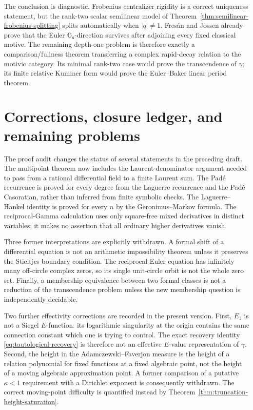 \documentclass[11pt]{article}
\theoremstyle{definition}
\theoremstyle{remark}
\begin{document}
The conclusion is diagnostic.  Frobenius centralizer rigidity is a correct
uniqueness statement, but the rank-two scalar semilinear model of
Theorem~\ref{thm:semilinear-frobenius-splitting} splits automatically when
\(|q|\ne1\).  Fres\'an and Jossen already prove that the
Euler $\mathbb G_a$-direction survives after adjoining every fixed
classical motive.  The remaining depth-one problem is therefore exactly a
comparison/fullness theorem transferring a complex rapid-decay relation to
the motivic category.  Its minimal rank-two case would prove the
transcendence of $\gamma$; its finite relative Kummer form would prove the
Euler--Baker linear period theorem.

\section{Corrections, closure ledger, and remaining problems}

The proof audit changes the status of several statements in the preceding
draft.  The multipoint theorem now includes the Laurent-denominator argument
needed to pass from a rational differential field to a finite Laurent sum.
The Pad\'e recurrence is proved for every degree from the Laguerre recurrence
and the Pad\'e Casoratian, rather than inferred from finite symbolic checks.
The Laguerre--Hankel identity is proved for every \(n\) by the
Geronimus--Markov formula.  The reciprocal-Gamma calculation uses only
square-free mixed derivatives in distinct variables; it makes no assertion
that all ordinary higher derivatives vanish.

Three former interpretations are explicitly withdrawn.  A formal shift of a
differential equation is not an arithmetic impossibility theorem unless it
preserves the Stieltjes boundary condition.  The reciprocal Euler equation
has infinitely many off-circle complex zeros, so its single unit-circle orbit
is not the whole zero set.  Finally, a membership equivalence between two
formal classes is not a reduction of the transcendence problem unless the
new membership question is independently decidable.

Two further effectivity corrections are recorded in the present version.
First, \(E_1\) is not a Siegel \(E\)-function: its logarithmic singularity
at the origin contains the same connection constant which one is trying to
control.  The exact recovery identity
\eqref{eq:tautological-recovery} is therefore not an effective
\(E\)-value representation of \(\gamma\).  Second, the height in the
Adamczewski--Faverjon measure is the height of a relation polynomial for
fixed functions at a fixed algebraic point, not the height of a moving
algebraic approximation point.  A former comparison of a putative
\(\kappa<1\) requirement with a Dirichlet exponent is consequently
withdrawn.  The correct moving-point difficulty is quantified instead by
Theorem~\ref{thm:truncation-height-saturation}.
\end{document}
